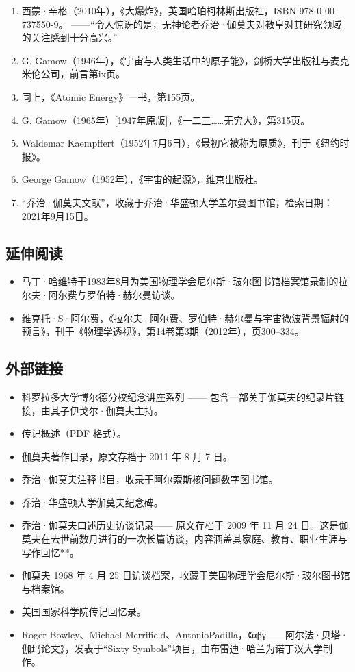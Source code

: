 \begin{enumerate}
\item 西蒙·辛格（2010年），《大爆炸》，英国哈珀柯林斯出版社，ISBN 978-0-00-737550-9。
  ——“令人惊讶的是，无神论者乔治·伽莫夫对教皇对其研究领域的关注感到十分高兴。”
\item G. Gamow（1946年），《宇宙与人类生活中的原子能》，剑桥大学出版社与麦克米伦公司，前言第ix页。
\item 同上，《Atomic Energy》一书，第155页。
\item G. Gamow（1965年）[1947年原版]，《一二三……无穷大》，第315页。
\item Waldemar Kaempffert（1952年7月6日），《最初它被称为原质》，刊于《纽约时报》。
\item George Gamow（1952年），《宇宙的起源》，维京出版社。
\item “乔治·伽莫夫文献”，收藏于乔治·华盛顿大学盖尔曼图书馆，检索日期：2021年9月15日。
\end{enumerate}
\subsection{延伸阅读}
\begin{itemize}
\item 马丁·哈维特于1983年8月为美国物理学会尼尔斯·玻尔图书馆档案馆录制的拉尔夫·阿尔费与罗伯特·赫尔曼访谈。
\item 维克托·S·阿尔费，《拉尔夫·阿尔费、罗伯特·赫尔曼与宇宙微波背景辐射的预言》，刊于《物理学透视》，第14卷第3期（2012年），页300–334。
\end{itemize}
\subsection{外部链接}
\begin{itemize}
\item 科罗拉多大学博尔德分校纪念讲座系列 —— 包含一部关于伽莫夫的纪录片链接，由其子伊戈尔·伽莫夫主持。
\item 传记概述（PDF 格式）。
\item 伽莫夫著作目录，原文存档于 2011 年 8 月 7 日。
\item 乔治·伽莫夫注释书目，收录于阿尔索斯核问题数字图书馆。
\item 乔治·华盛顿大学伽莫夫纪念碑。
\item 乔治·伽莫夫口述历史访谈记录—— 原文存档于 2009 年 11 月 24 日。这是伽莫夫在去世前数月进行的一次长篇访谈，内容涵盖其家庭、教育、职业生涯与写作回忆**。
\item 伽莫夫 1968 年 4 月 25 日访谈档案，收藏于美国物理学会尼尔斯·玻尔图书馆与档案馆。
\item 美国国家科学院传记回忆录。
\item Roger Bowley、Michael Merrifield、AntonioPadilla，《αβγ——阿尔法·贝塔·伽玛论文》，发表于“Sixty Symbols”项目，由布雷迪·哈兰为诺丁汉大学制作。
\end{itemize}